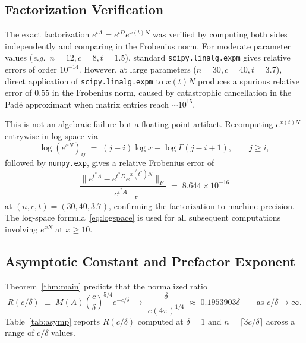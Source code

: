 \documentclass[11pt,reqno]{article}
\theoremstyle{plain}
\theoremstyle{definition}
\theoremstyle{remark}
\numberwithin{equation}{section}
\begin{document}
\subsection{Factorization Verification}\label{subsec:factverif}

The exact factorization $e^{tA} = e^{tD}e^{x(t)N}$ was verified by computing both sides independently and comparing in the Frobenius norm. For moderate parameter values (\emph{e.g.}\ $n = 12, c = 8, t = 1.5$), standard \texttt{scipy.linalg.expm} gives relative errors of order $10^{-14}$. However, at large parameters ($n = 30, c = 40, t = 3.7$), direct application of \texttt{scipy.linalg.expm} to $x(t)N$ produces a spurious relative error of $0.55$ in the Frobenius norm, caused by catastrophic cancellation in the Pad\'{e} approximant when matrix entries reach $\sim 10^{15}$.

This is not an algebraic failure but a floating-point artifact. Recomputing $e^{x(t)N}$ entrywise in log space via
\begin{equation}\label{eq:logspace}
  \log\left(e^{xN}\right)_{ij} \;=\; (j-i)\log x - \log\Gamma(j-i+1), \qquad j \ge i,
\end{equation}
followed by \texttt{numpy.exp}, gives a relative Frobenius error of
\begin{equation}\label{eq:factorerr}
  \frac{\|e^{t^*A} - e^{t^*D}e^{x(t^*)N}\|_F}{\|e^{t^*A}\|_F} \;=\; 8.644 \times 10^{-16}
\end{equation}
at $(n, c, t) = (30, 40, 3.7)$, confirming the factorization to machine precision. The log-space formula~\eqref{eq:logspace} is used for all subsequent computations involving $e^{xN}$ at $x \ge 10$.

\subsection{Asymptotic Constant and Prefactor Exponent}\label{subsec:asymp}

Theorem~\ref{thm:main} predicts that the normalized ratio
\begin{equation}\label{eq:Rdef}
  R(c/\delta) \;\equiv\; M(A) \left(\frac{c}{\delta}\right)^{5/4} e^{-c/\delta} \;\longrightarrow\; \frac{\delta}{e(4\pi)^{1/4}} \;\approx\; 0.1953903\delta \qquad\text{as } c/\delta \to \infty.
\end{equation}
Table~\ref{tab:asymp} reports $R(c/\delta)$ computed at $\delta = 1$ and $n = \lceil 3c/\delta \rceil$ across a range of $c/\delta$ values.
\end{document}
